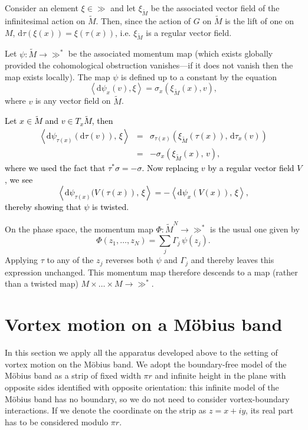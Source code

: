 \documentclass[11pt,twoside]{article}
\theoremstyle{definition}
\numberwithin{equation}{section}
\def\Mt{\widetilde{M}}
\begin{document}
Consider an element $\xi\in\gg$ and let $\xi_{\Mt}$ be the associated vector field of the infinitesimal action on $\Mt$. Then, since the action of $G$ on $\Mt$ is the lift of one on $M$, $\mathrm{d}\tau(\xi(x)) = \xi(\tau(x))$, i.e. $\xi_{\Mt}$ is a regular vector field. 


Let $\psi:\Mt\to\gg^*$ be the associated momentum map (which exists globally provided the cohomological obstruction vanishes---if it does not vanish then the map exists locally). The map $\psi$ is  defined up to a constant by the equation
\begin{equation}
    \label{eq: momentm map}
    \left<\mathrm{d}\psi_x(v),\xi\right> = \sigma_x\left(\xi_{\Mt}(x),v\right),
\end{equation}
where $v$ is any vector field on $\Mt$. 


\textcolor{black}{Let $x\in\Mt$ and $v\in T_{x}\Mt$, then
\begin{eqnarray*}
    \left<\mathrm{d}\psi_{\tau(x)}(\mathrm{d}\tau(v)),\, \xi\right> &=&
    \sigma_{\tau(x)}(\xi_{\Mt}(\tau(x)),\, \mathrm{d}\tau_x(v)) \\
    &=& - \sigma_x(\xi_{\Mt}(x),\,v),
\end{eqnarray*} 
where we used the fact that $\tau^*\sigma=-\sigma$.  Now replacing $v$ by a regular vector field $V$, we see
$$\left<\mathrm{d}\psi_{\tau(x)}(V(\tau(x)),\, \xi\right> = 
    - \left<\mathrm{d}\psi_{x}(V(x)),\, \xi\right>,$$
    thereby showing that $\psi$ is twisted. }




On the phase space, the momentum map  $\Phi:\Mt^N\to\gg^*$ is the usual one given by
$$\Phi(z_1,\dots,z_N) = \sum_j\Gamma_j\,\psi(z_j).$$
Applying $\tau$ to any of the $z_j$ reverses both $\psi$ and $\Gamma_j$ and thereby leaves this expression unchanged. This momentum map therefore descends to a map (rather than a twisted map) $M\times\dots\times M\to\gg^*$.  




\section{{Vortex motion on a M\"obius band}}  
 \label{sec:vortex motion Mobius}
In this section we apply all the apparatus developed above to the setting of vortex motion on the M\"obius band. We adopt the boundary-free model of the M\"obius band as a strip of fixed  width $\pi r$ and infinite height in the plane with opposite sides identified with opposite orientation: this infinite model of the M\"obius band has no boundary, so we do not need to consider vortex-boundary interactions. If we denote the coordinate on the strip as $z = x+iy$, its real part has to be considered modulo $\pi r$. 
\end{document}
